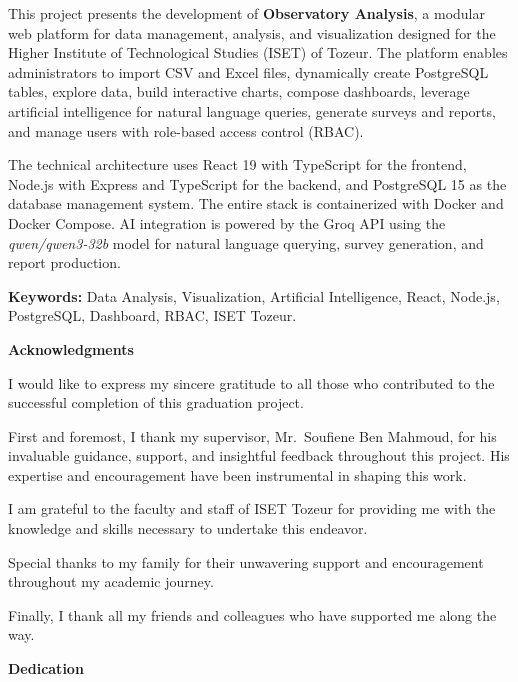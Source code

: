 \documentclass[12pt,a4paper]{report}
\begin{document}
This project presents the development of \textbf{Observatory Analysis}, a modular web platform for data management, analysis, and visualization designed for the Higher Institute of Technological Studies (ISET) of Tozeur. The platform enables administrators to import CSV and Excel files, dynamically create PostgreSQL tables, explore data, build interactive charts, compose dashboards, leverage artificial intelligence for natural language queries, generate surveys and reports, and manage users with role-based access control (RBAC).

The technical architecture uses React 19 with TypeScript for the frontend, Node.js with Express and TypeScript for the backend, and PostgreSQL 15 as the database management system. The entire stack is containerized with Docker and Docker Compose. AI integration is powered by the Groq API using the \textit{qwen/qwen3-32b} model for natural language querying, survey generation, and report production.

\vspace{0.3cm}
\textbf{Keywords:} Data Analysis, Visualization, Artificial Intelligence, React, Node.js, PostgreSQL, Dashboard, RBAC, ISET Tozeur.

\newpage
\thispagestyle{empty}
\begin{center}
{\Large\bfseries Acknowledgments}
\end{center}
\vspace{0.5cm}

I would like to express my sincere gratitude to all those who contributed to the successful completion of this graduation project.

First and foremost, I thank my supervisor, Mr.~Soufiene Ben Mahmoud, for his invaluable guidance, support, and insightful feedback throughout this project. His expertise and encouragement have been instrumental in shaping this work.

I am grateful to the faculty and staff of ISET Tozeur for providing me with the knowledge and skills necessary to undertake this endeavor.

Special thanks to my family for their unwavering support and encouragement throughout my academic journey.

Finally, I thank all my friends and colleagues who have supported me along the way.

\newpage
\thispagestyle{empty}
\begin{center}
{\Large\bfseries Dedication}
\end{center}
\vspace{1cm}
\end{document}
